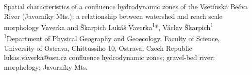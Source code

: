 \abstract
{Spatial characteristics of a confluence hydrodynamic zones of the Vsetínská Bečva River (Javorníky Mts.): a relationship between watershed and reach scale morphology} 
{Vaverka and Škarpich} 
{Lukáš Vaverka\textsuperscript{1}*, Václav Škarpich\textsuperscript{1}} 
{\TLtag} 
{
	\textsuperscript{1}Department of Physical Geography and Geoecology, Faculty of Science, University of Ostrava, Chittussiho 10, Ostrava, Czech Republic
}
{lukas.vaverka@osu.cz}  %
{confluence hydrodynamic zones; gravel-bed river; morphology; Javorníky Mts.}
